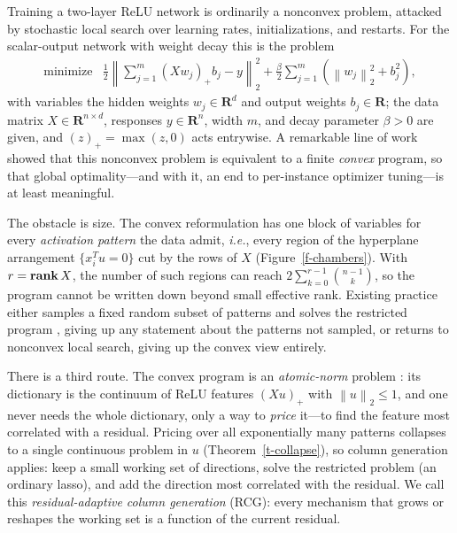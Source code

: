 \documentclass[12pt]{article}
\theoremstyle{plain}
\theoremstyle{definition}
\newcommand{\reals}{\mathbf{R}}
\newcommand{\norm}[1]{\left\lVert #1\right\rVert}
\newcommand{\relu}[1]{\left(#1\right)_+}
\newcommand{\rank}{\mathop{\bf rank}}
\begin{document}
Training a two-layer ReLU network is ordinarily a nonconvex problem, attacked
by stochastic local search over learning rates, initializations, and restarts.
For the scalar-output network with weight decay this is the problem
\begin{equation}\label{e-weight-decay}
\begin{array}{ll}
\mbox{minimize} & \displaystyle\frac12\norm{\sum_{j=1}^m\relu{Xw_j}b_j-y}_2^2
  +\frac\beta2\sum_{j=1}^m\left(\norm{w_j}_2^2+b_j^2\right),
\end{array}
\end{equation}
with variables the hidden weights $w_j\in\reals^d$ and output weights
$b_j\in\reals$; the data matrix $X\in\reals^{n\times d}$, responses
$y\in\reals^n$, width $m$, and decay parameter $\beta>0$ are given, and
$\relu{z}=\max(z,0)$ acts entrywise. A remarkable line of work
\citep{pilanci2020neural,ergen2021convex} showed that this nonconvex problem is
equivalent to a finite \emph{convex} program, so that global optimality---and
with it, an end to per-instance optimizer tuning---is at least meaningful.

The obstacle is size. The convex reformulation has one block of variables for
every \emph{activation pattern} the data admit, {\it i.e.}, every region of the
hyperplane arrangement $\{x_i^Tu=0\}$ cut by the rows of $X$
(Figure~\ref{f-chambers}). With $r=\rank X$, the number of such regions can
reach $2\sum_{k=0}^{r-1}\binom{n-1}{k}$, so the program cannot be written down
beyond small effective rank. Existing practice either samples a fixed random
subset of patterns and solves the restricted program
\citep{mishkin2022fast,kim2024sampling}, giving up any statement about the
patterns not sampled, or returns to nonconvex local search, giving up the
convex view entirely.

There is a third route. The convex program is an \emph{atomic-norm} problem
\citep{chandrasekaran2012convex}: its dictionary is the continuum of ReLU
features $\relu{Xu}$ with $\norm u_2\le1$, and one never needs the whole
dictionary, only a way to \emph{price} it---to find the feature most correlated
with a residual. Pricing over all exponentially many patterns collapses to a
single continuous problem in $u$ (Theorem~\ref{t-collapse}), so column
generation applies: keep a small working set of directions, solve the
restricted problem (an ordinary lasso), and add the direction most correlated
with the residual. We call this \emph{residual-adaptive column generation} (RCG):
every mechanism that grows or reshapes the working set is a function of the
current residual.
\end{document}
